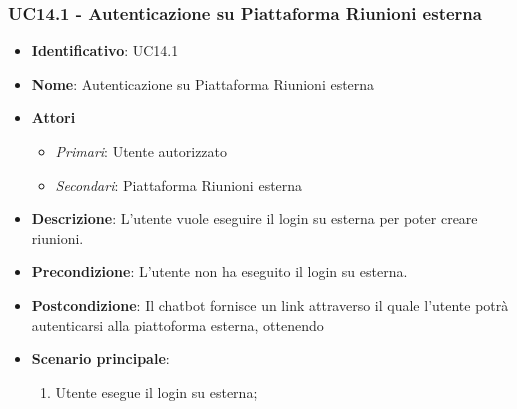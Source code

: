 \subsubsection{UC14.1 - Autenticazione su Piattaforma Riunioni esterna }
\begin{itemize}
	\item \textbf{Identificativo}: UC14.1
	\item \textbf{Nome}: Autenticazione su Piattaforma Riunioni esterna
	\item \textbf{Attori}
	\begin{itemize} 
		\item \textit{Primari}: Utente autorizzato
		\item \textit{Secondari}: Piattaforma Riunioni esterna
	\end{itemize}
	\item \textbf{Descrizione}: L'utente vuole eseguire il login su  esterna per poter creare riunioni.
	\item \textbf{Precondizione}: L'utente non ha eseguito il login su  esterna.
	\item \textbf{Postcondizione}: Il chatbot fornisce un link attraverso il quale l'utente potrà autenticarsi alla piattoforma esterna, ottenendo 
	\item \textbf{Scenario principale}: \begin{enumerate}
		\item Utente esegue il login su  esterna; 
	\end{enumerate}
\end{itemize}

